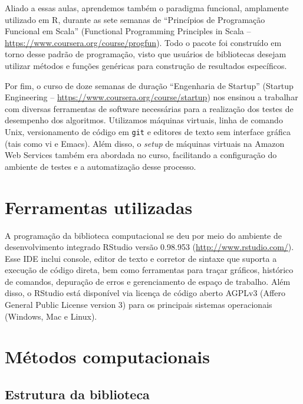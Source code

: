 Aliado a essas aulas, aprendemos também o paradigma funcional, amplamente utilizado em R, durante as sete semanas de ``Princípios de Programação Funcional em Scala'' (Functional Programming Principles in Scala -- \url{https://www.coursera.org/course/progfun}). Todo o pacote foi construído em torno desse padrão de programação, visto que usuários de bibliotecas desejam utilizar métodos e funções genéricas para construção de resultados específicos.

Por fim, o curso de doze semanas de duração ``Engenharia de Startup'' (Startup Engineering -- \url{https://www.coursera.org/course/startup}) nos ensinou a trabalhar com diversas ferramentas de software necessárias para a realização dos testes de desempenho dos algoritmos. Utilizamos máquinas virtuais, linha de comando Unix, versionamento de código em \texttt{git} e editores de texto sem interface gráfica (tais como vi e Emacs). Além disso, o \textit{setup} de máquinas virtuais na Amazon Web Services também era abordada no curso, facilitando a configuração do ambiente de testes e a automatização desse processo. 

\section{Ferramentas utilizadas} %
\label{sec:ferramentas_utilizadas}

A programação da biblioteca computacional se deu por meio do ambiente de desenvolvimento integrado RStudio versão 0.98.953 (\url{http://www.rstudio.com/}). Esse IDE inclui console, editor de texto e corretor de sintaxe que suporta a execução de código direta, bem como ferramentas para traçar gráficos, histórico de comandos, depuração de erros e gerenciamento de espaço de trabalho. Além disso, o RStudio está disponível via licença de código aberto AGPLv3 (Affero General Public License version 3) para os principais sistemas operacionais (Windows, Mac e Linux).

\section{Métodos computacionais} %
\label{sec:m_todos_computacionais}



\subsection{Estrutura da biblioteca} %
\label{sub:estrutura_da_biblioteca}

